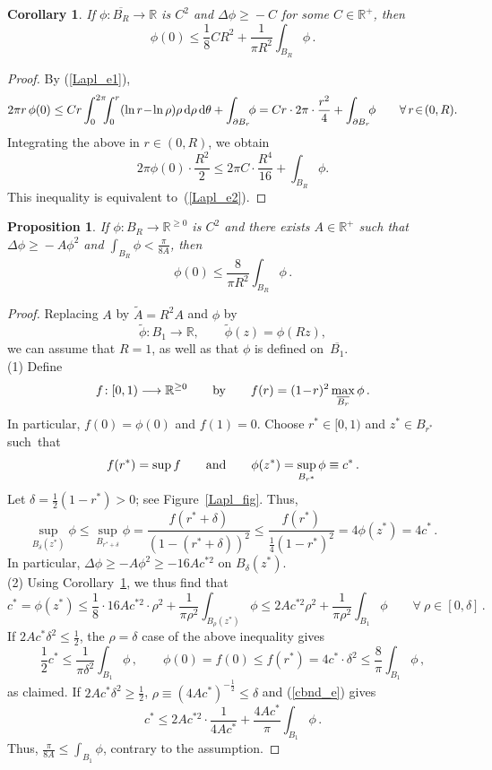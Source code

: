 \documentclass[11pt]{article}
\numberwithin{equation}{section}
\newtheorem{prp}[thm]{Proposition}
\newtheorem{crl}[thm]{Corollary}
\theoremstyle{definition}
\def\BE#1{\begin{equation}\label{#1}}
\def\EE{\end{equation}}
\def\eref#1{(\ref{#1})}
\def\ov#1{\overline{#1}}
\def\ti#1{\widetilde{#1}}
\def\lra{\longrightarrow}
\def\R{\mathbb R}
\def\de{\delta}
\def\th{\theta}
\def\De{\Delta}
\def\prt{\partial}
\def\nd{\textnormal{d}}
\begin{document}
\begin{crl}\label{Lapl_crl}
If $\phi\!:\ov{B_R}\!\lra\!\R$ is $C^2$ and $\De\phi\!\ge\!-C$ for some $C\!\in\!\R^+$, 
then
\BE{Lapl_e2}
\phi(0)\le \frac18 CR^2+\frac1{\pi R^2}\int_{B_R}\phi\,.\EE 
\end{crl}

\begin{proof}
By \eref{Lapl_e1}, 
$$2\pi r\,\phi(0)\le Cr\int_0^{2\pi}\!\!\!\int_0^r(\ln r\!-\!\ln\rho)
\rho\,\nd\rho\,\nd\th+\int_{\prt B_r}\!\!\phi
=Cr\cdot 2\pi\cdot\frac{r^2}{4}+\int_{\prt B_r}\!\!\phi
\qquad\forall\,r\!\in\!(0,R).$$
Integrating the above in $r\!\in\!(0,R)$, we obtain
$$2\pi\phi(0)\cdot\frac{R^2}{2} \le 2\pi C\cdot\frac{R^4}{16}
+\int_{B_R}\phi.$$
This inequality is equivalent to~\eref{Lapl_e2}.
\end{proof}

\begin{prp}\label{Lapl_prp}
If $\phi\!:B_R\!\lra\!\R^{\ge0}$ is $C^2$ and 
there exists $A\!\in\!\R^+$ such that 
$\De\phi\!\ge\!-A\phi^2$ and $\displaystyle\int_{B_R}\phi<\frac{\pi}{8A}$, then
\BE{Lapl_e3}
\phi(0)\le \frac8{\pi R^2}\int_{B_R}\phi\,.\EE 
\end{prp}

\begin{proof}
Replacing $A$ by $\ti{A}\!=\!R^2A$ and  $\phi$ by 
$$\ti\phi\!: B_1\lra\R, \qquad\ti\phi(z)=\phi(Rz),$$
we can assume that $R\!=\!1$, as well as that $\phi$ is defined on~$\ov{B_1}$.\\

\noindent
(1) Define
$$f\!:[0,1)\lra\R^{\ge0} \qquad\hbox{by}\qquad 
f(r)=(1\!-\!r)^2\max_{\ov{B_r}}\phi\,.$$
In particular, $f(0)\!=\!\phi(0)$ and $f(1)\!=\!0$.
Choose $r^*\!\in\![0,1)$ and $z^*\!\in\!B_{r^*}$ such~that 
$$f(r^*)=\sup f \qquad\hbox{and}\qquad 
\phi(z^*)=\sup_{B_{r^*}}\phi\equiv c^*\,.$$
Let $\de\!=\!\frac12(1\!-\!r^*)\!>\!0$; see Figure~\ref{Lapl_fig}. Thus,
$$\sup_{B_{\de}(z^*)}\phi \le  \sup_{B_{r^*+\de}}\phi
=\frac{f(r^*\!+\!\de)}{(1\!-\!(r^*\!+\!\de))^2}
\le \frac{f(r^*)}{\frac14(1\!-\!r^*)^2}
=4\phi(z^*)=4c^*\,.$$
In particular, $\De\phi\ge -A\phi^2\ge -16Ac^{*2}$ on $B_{\de}(z^*)$.\\

\noindent
(2) Using Corollary~\ref{Lapl_crl}, we thus find that 
\BE{cbnd_e} c^*=\phi(z^*)\le\frac18\cdot 16Ac^{*2}\cdot\rho^2
+\frac{1}{\pi\rho^2}\int_{B_{\rho}(z^*)}\!\!\!\phi
\le 2Ac^{*2}\rho^2+\frac{1}{\pi\rho^2}\int_{B_1}\!\!\!\phi
\qquad\forall~\rho\!\in\![0,\de]\,.\EE
If $2Ac^*\de^2\le\frac12$, the $\rho\!=\!\de$ case of the above inequality gives
$$\frac12 c^*\le \frac{1}{\pi\de^2}\int_{B_1}\phi \,,
\qquad
\phi(0)=f(0)\le f(r^*)=4c^*\cdot \de^2
\le \frac8\pi \int_{B_1}\phi\,,$$
as claimed.
If $2Ac^*\de^2\ge\frac12$, $\rho\!\equiv\!(4Ac^*)^{-\frac12}\le\de$ and 
\eref{cbnd_e} gives
$$c^*\le 2Ac^{*2}\cdot\frac{1}{4Ac^*}+\frac{4Ac^*}{\pi}\int_{B_1}\phi\,.$$
Thus, $\displaystyle\frac{\pi}{8A}\le\int_{B_1}\!\!\phi$,
contrary to the assumption.
\end{proof}
\end{document}
